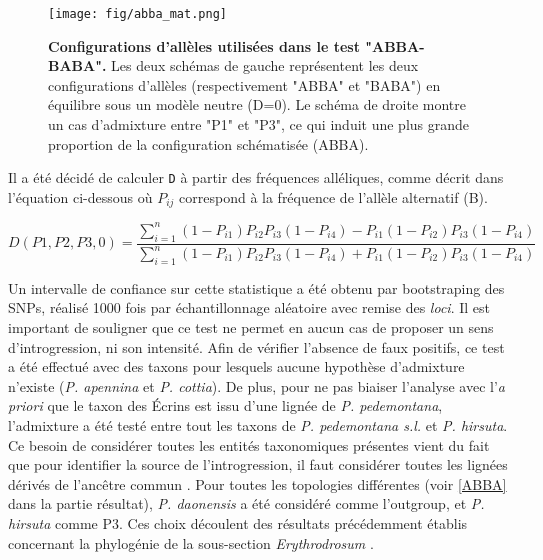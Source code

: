 \begin{figure}[!ht]
    \centering
    \texttt{[image: fig/abba\_mat.png]}
    \caption{\textbf{Configurations d'allèles utilisées dans le test "ABBA-BABA".} Les deux schémas de gauche représentent les deux configurations d'allèles (respectivement "ABBA" et "BABA") en équilibre sous un modèle neutre (D=0).  Le schéma de droite montre un cas d'admixture entre "P1" et "P3", ce qui induit une plus grande proportion de la configuration schématisée (ABBA).}
    \label{abba-top}
    \centering
\end{figure} 
Il a été décidé de calculer \verb|D| à partir des fréquences alléliques, comme décrit dans l'équation ci-dessous où \textit{$P_{ij}$} correspond à la fréquence de l'allèle alternatif (B).

\[D(P1,P2,P3,0)=\frac{\sum_{i=1}^{n} (1-P_{i1})P_{i2}P_{i3}(1-P_{i4})-P_{i1}(1-P_{i2})P_{i3}(1-P_{i4})}{\sum_{i=1}^{n} (1-P_{i1})P_{i2}P_{i3}(1-P_{i4})+P_{i1}(1-P_{i2})P_{i3}(1-P_{i4})}\]

Un intervalle de confiance sur cette statistique a été obtenu par bootstraping des SNPs, réalisé 1000 fois par échantillonnage aléatoire avec remise des \textit{loci}.
Il est important de souligner que ce test ne permet en aucun cas de proposer un sens d'introgression, ni son intensité. Afin de vérifier l'absence de faux positifs, ce test a été effectué avec des taxons pour lesquels aucune hypothèse d'admixture n'existe (\textit{P. apennina} et \textit{P. cottia}). De plus, pour ne pas biaiser l'analyse avec l'\textit{a priori} que le taxon des Écrins est issu d'une lignée de \textit{P. pedemontana}, l'admixture a été testé entre tout les taxons de \textit{P. pedemontana s.l.} et \textit{P. hirsuta}. Ce besoin de considérer toutes les entités taxonomiques présentes vient du fait que pour identifier la source de l'introgression, il faut considérer toutes les lignées dérivés de l'ancêtre commun \citep{Eaton2015}. Pour toutes les topologies différentes (voir \ref{ABBA} dans la partie résultat), \textit{P. daonensis} a été considéré comme l'outgroup, et \textit{P. hirsuta} comme P3. Ces choix découlent des résultats précédemment établis concernant la phylogénie de la sous-section \textit{Erythrodrosum} \citep{Boucher2016a}.

